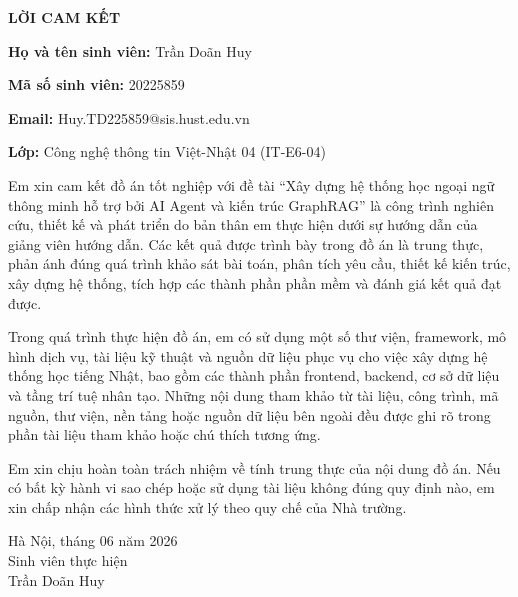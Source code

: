\documentclass[../DoAn.tex]{subfiles}
\begin{document}
\begin{center}
    \Large{\textbf{LỜI CAM KẾT}}\\
\end{center}
\vspace{1cm}

\noindent\textbf{Họ và tên sinh viên:} Trần Doãn Huy

\noindent\textbf{Mã số sinh viên:} 20225859

\noindent\textbf{Email:} Huy.TD225859@sis.hust.edu.vn

\noindent\textbf{Lớp:} Công nghệ thông tin Việt-Nhật 04 (IT-E6-04)

Em xin cam kết đồ án tốt nghiệp với đề tài ``Xây dựng hệ thống học ngoại ngữ thông minh hỗ trợ bởi AI Agent và kiến trúc GraphRAG'' là công trình nghiên cứu, thiết kế và phát triển do bản thân em thực hiện dưới sự hướng dẫn của giảng viên hướng dẫn. Các kết quả được trình bày trong đồ án là trung thực, phản ánh đúng quá trình khảo sát bài toán, phân tích yêu cầu, thiết kế kiến trúc, xây dựng hệ thống, tích hợp các thành phần phần mềm và đánh giá kết quả đạt được.

Trong quá trình thực hiện đồ án, em có sử dụng một số thư viện, framework, mô hình dịch vụ, tài liệu kỹ thuật và nguồn dữ liệu phục vụ cho việc xây dựng hệ thống học tiếng Nhật, bao gồm các thành phần frontend, backend, cơ sở dữ liệu và tầng trí tuệ nhân tạo. Những nội dung tham khảo từ tài liệu, công trình, mã nguồn, thư viện, nền tảng hoặc nguồn dữ liệu bên ngoài đều được ghi rõ trong phần tài liệu tham khảo hoặc chú thích tương ứng.

Em xin chịu hoàn toàn trách nhiệm về tính trung thực của nội dung đồ án. Nếu có bất kỳ hành vi sao chép hoặc sử dụng tài liệu không đúng quy định nào, em xin chấp nhận các hình thức xử lý theo quy chế của Nhà trường.

\vspace{1cm}
\begin{flushright}
Hà Nội, tháng 06 năm 2026\\[0.5cm]
Sinh viên thực hiện\\[2cm]
Trần Doãn Huy
\end{flushright}
\end{document}
